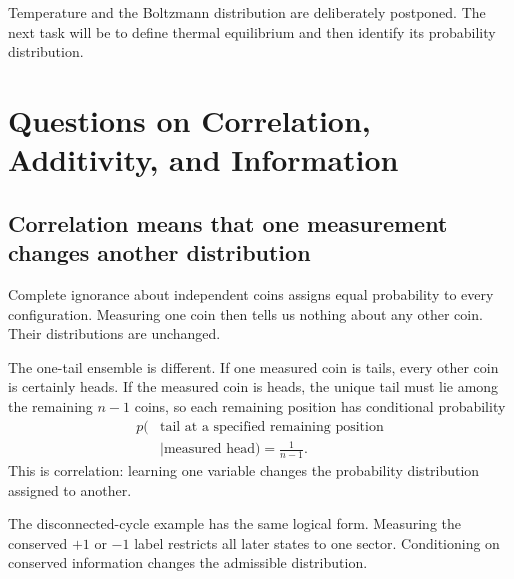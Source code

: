 Temperature and the Boltzmann distribution are deliberately postponed. The
next task will be to define thermal equilibrium and then identify its
probability distribution.

\section{Questions on Correlation, Additivity, and Information}

\subsection{Correlation means that one measurement changes another
distribution}

Complete ignorance about independent coins assigns equal probability to
every configuration. Measuring one coin then tells us nothing about any
other coin. Their distributions are unchanged.

The one-tail ensemble is different. If one measured coin is tails, every
other coin is certainly heads. If the measured coin is heads, the unique tail
must lie among the remaining \(n-1\) coins, so each remaining position has
conditional probability
\begin{equation}
\begin{aligned}
 p(&\text{tail at a specified remaining position}\\
   &\mid\text{measured head})=\frac{1}{n-1}.
\end{aligned}
 \label{eq:sm1-conditional-tail}
\end{equation}
This is correlation: learning one variable changes the probability
distribution assigned to another.

\begin{classroomqa}
\end{classroomqa}

The disconnected-cycle example has the same logical form. Measuring the
conserved \(+1\) or \(-1\) label restricts all later states to one sector.
Conditioning on conserved information changes the admissible distribution.


